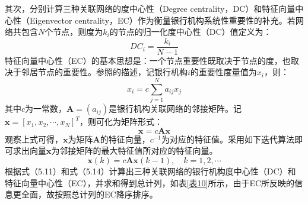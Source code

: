 \documentclass[lang=cn]{elegantpaper}
\begin{document}
其次，分别计算三种关联网络的度中心性（Degree centrality，DC）和特征向量中心性（Eigenvector centrality，EC）作为衡量银行机构系统性重要性的补充。若网络共包含$N$个节点，则度为$k_i$的节点的归一化度中心性（DC）值定义为：
\begin{equation}
    DC_i=\frac{k_i}{N-1}
\end{equation}
特征向量中心性（EC）的基本思想是：一个节点重要性既取决于节点的度，也取决于邻居节点的重要性。参照的描述，记银行机构$i$的重要性度量值为$x_i$，则：
\begin{equation}
    x_i=c\sum_{j=1}^N a_{ij}x_j
\end{equation}
其中$c$为一常数，$\bm{A}=(a_{ij})$是银行机构关联网络的邻接矩阵。记$\bm{x}=[x_1,x_2,\cdots,x_N]^T$，则可化为矩阵形式：
\begin{equation}
    \bm{x}=c\bm{A}\bm{x}
\end{equation}
观察上式可得，$\bm{x}$为矩阵$\bm{A}$的特征向量，$c^{-1}$为对应的特征值。采用如下迭代算法即可求出向量$\bm{x}$为邻接矩阵的最大特征值所对应的特征向量。
\begin{equation}
    \bm{x}(k)=c\bm{A}\bm{x}(k-1),\quad k=1,2,\cdots
\end{equation}
根据式（5.11）和式（5.14）计算出三种关联网络的银行机构度中心性（DC）和特征向量中心性（EC），并求和得到总计列，如表\ref{表10}所示，由于EC所反映的信息更全面，故按照总计列的EC降序排序。
\end{document}
